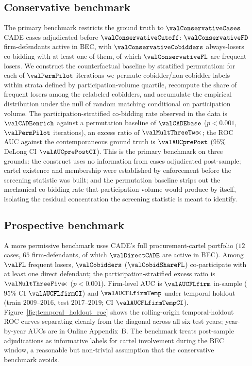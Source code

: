 \subsection{Conservative benchmark}
\label{sec:cade_contemporaneous}

The primary benchmark restricts the ground truth to
$\valConservativeCases$ CADE cases adjudicated before
$\valConservativeCutoff$: $\valConservativeFD$ firm-defendants
active in BEC, with $\valConservativeCobidders$ always-losers
co-bidding with at least one of them, of which
$\valConservativeFL$ are frequent losers. We construct the
counterfactual baseline by stratified permutation: for each of
$\valPermPilot$ iterations we permute cobidder/non-cobidder
labels within strata defined by participation-volume quartile,
recompute the share of frequent losers among the relabeled
cobidders, and accumulate the empirical distribution under the
null of random matching conditional on participation volume. The
participation-stratified co-bidding rate observed in the data is
$\valCADEenrich$ against a permutation baseline of
$\valCADEbase$ ($p<0.001$, $\valPermPilot$ iterations), an excess
ratio of $\valMultThreeTwo\!\!\times$; the ROC AUC against the
contemporaneous ground truth is $\valAUCprePost$
($95\%$ DeLong CI $\valAUCprePostCI$). This is the primary
benchmark on three grounds: the construct uses no information
from cases adjudicated post-sample; cartel existence and
membership were established by enforcement before the screening
statistic was built; and the permutation baseline strips out the
mechanical co-bidding rate that participation volume would
produce by itself, isolating the residual concentration the
screening statistic is meant to identify.

\subsection{Prospective benchmark}
\label{sec:cade_prospective}

A more permissive benchmark uses CADE's full procurement-cartel
portfolio ($12$ cases, $65$ firm-defendants, of which
$\valDirectCADE$ are active in BEC). Among $\valFL$ frequent
losers, $\valCobidders$ ($\valCobidShareFL$) co-participate with
at least one direct defendant; the participation-stratified excess
ratio is $\valMultThreeFive\!\!\times$ ($p<0.001$). Firm-level
AUC is $\valAUCFLfirm$ in-sample
($95\%$ CI $\valAUCFLfirmCI$) and $\valAUCFLfirmTemp$ under
temporal holdout (train $2009$--$2016$, test $2017$--$2019$;
CI $\valAUCFLfirmTempCI$). Figure~\ref{fig:temporal_holdout_roc}
shows the rolling-origin temporal-holdout ROC curves separating
cleanly from the diagonal across all six test years; year-by-year
AUCs are in Online Appendix~B. The benchmark treats post-sample
adjudications as informative labels for cartel involvement during
the BEC window, a reasonable but non-trivial assumption that the
conservative benchmark avoids.


